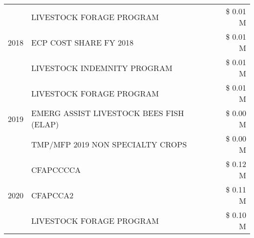 \begin{tabular}{llr}
\cline{1-3}
\multirow[t]{3}{*}{2018} & LIVESTOCK FORAGE PROGRAM & \$ 0.01 M \\
 & ECP COST SHARE FY 2018 & \$ 0.01 M \\
 & LIVESTOCK INDEMNITY PROGRAM & \$ 0.01 M \\
\cline{1-3}
\multirow[t]{3}{*}{2019} & LIVESTOCK FORAGE PROGRAM & \$ 0.01 M \\
 & EMERG ASSIST LIVESTOCK BEES FISH (ELAP) & \$ 0.00 M \\
 & TMP/MFP 2019 NON SPECIALTY CROPS & \$ 0.00 M \\
\cline{1-3}
\multirow[t]{3}{*}{2020} & CFAPCCCCA & \$ 0.12 M \\
 & CFAPCCA2 & \$ 0.11 M \\
 & LIVESTOCK FORAGE PROGRAM & \$ 0.10 M \\
\cline{1-3}
\bottomrule
\end{tabular}
